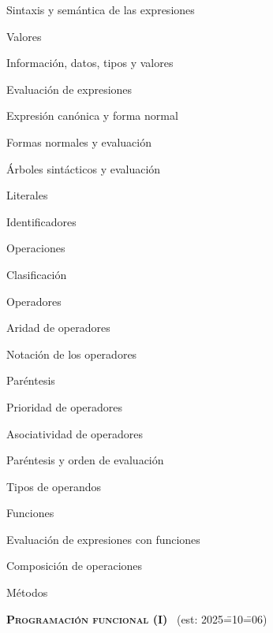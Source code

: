 \begin{longenum}
\begin{longenum}
\begin{longenum}
            \item Sintaxis y semántica de las expresiones
        \end{longenum}
        \item Valores
        \begin{longenum}
            \item Información, datos, tipos y valores
            \item Evaluación de expresiones
            \item Expresión canónica y forma normal
            \item Formas normales y evaluación
            \item Árboles sintácticos y evaluación
            \item Literales
            \item Identificadores
        \end{longenum}
        \item Operaciones
        \begin{longenum}
            \item Clasificación
            \item Operadores
            \begin{longenum}
                \item Aridad de operadores
                \item Notación de los operadores
                \item Paréntesis
                \item Prioridad de operadores
                \item Asociatividad de operadores
                \item Paréntesis y orden de evaluación
                \item Tipos de operandos
            \end{longenum}
            \item Funciones
            \begin{longenum}
                \item Evaluación de expresiones con funciones
                \item Composición de operaciones
            \end{longenum}
            \item Métodos
        \end{longenum}
    \end{longenum}
    \item \textbf{\textsc{Programación funcional (I)}} \ (est: 2025\==10\==06)

\end{longenum}
